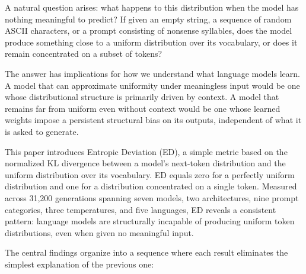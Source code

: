 \documentclass{article}
\begin{document}
A natural question arises: what happens to this distribution when the model has nothing meaningful to predict? If given an empty string, a sequence of random ASCII characters, or a prompt consisting of nonsense syllables, does the model produce something close to a uniform distribution over its vocabulary, or does it remain concentrated on a subset of tokens?

The answer has implications for how we understand what language models learn. A model that can approximate uniformity under meaningless input would be one whose distributional structure is primarily driven by context. A model that remains far from uniform even without context would be one whose learned weights impose a persistent structural bias on its outputs, independent of what it is asked to generate.

This paper introduces Entropic Deviation (ED), a simple metric based on the normalized KL divergence between a model's next-token distribution and the uniform distribution over its vocabulary. ED equals zero for a perfectly uniform distribution and one for a distribution concentrated on a single token. Measured across 31,200 generations spanning seven models, two architectures, nine prompt categories, three temperatures, and five languages, ED reveals a consistent pattern: language models are structurally incapable of producing uniform token distributions, even when given no meaningful input.

The central findings organize into a sequence where each result eliminates the simplest explanation of the previous one:
\end{document}

